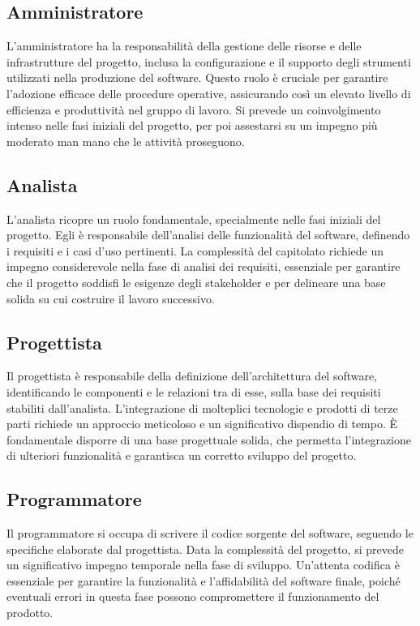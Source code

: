 \documentclass[a4paper, 12pt]{article}
\begin{document}
\subsection{Amministratore}
L’amministratore ha la responsabilità della gestione delle risorse e delle infrastrutture del progetto, inclusa la configurazione e il supporto degli strumenti utilizzati nella produzione del software. 
Questo ruolo è cruciale per garantire l'adozione efficace delle procedure operative, assicurando così un elevato livello di efficienza e produttività nel gruppo di lavoro. 
Si prevede un coinvolgimento intenso nelle fasi iniziali del progetto, per poi assestarsi su un impegno più moderato man mano che le attività proseguono.
\subsection{Analista}
L’analista ricopre un ruolo fondamentale, specialmente nelle fasi iniziali del progetto. Egli è responsabile dell’analisi delle funzionalità del software, definendo i requisiti e i casi d’uso pertinenti. 
La complessità del capitolato richiede un impegno considerevole nella fase di analisi dei requisiti, essenziale per garantire che il progetto soddisfi le esigenze degli stakeholder e per delineare una base solida su cui costruire il lavoro successivo.
\subsection{Progettista}
Il progettista è responsabile della definizione dell'architettura del software, identificando le componenti e le relazioni tra di esse, sulla base dei requisiti stabiliti dall’analista. 
L'integrazione di molteplici tecnologie e prodotti di terze parti richiede un approccio meticoloso e un significativo dispendio di tempo. 
È fondamentale disporre di una base progettuale solida, che permetta l'integrazione di ulteriori funzionalità e garantisca un corretto sviluppo del progetto.
\subsection{Programmatore}
Il programmatore si occupa di scrivere il codice sorgente del software, seguendo le specifiche elaborate dal progettista. Data la complessità del progetto, si prevede un significativo impegno temporale nella fase di sviluppo. 
Un'attenta codifica è essenziale per garantire la funzionalità e l'affidabilità del software finale, poiché eventuali errori in questa fase possono compromettere il funzionamento del prodotto.
\end{document}
